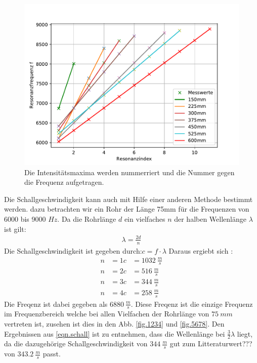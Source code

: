\begin{figure}[h!]
  \centering
  \includegraphics[width=\textwidth]{linearfit.pdf}
  \caption{Die Intensitätsmaxima werden nummerriert und die Nummer gegen die Frequenz aufgetragen.}
  \label{fig.linearfit}
\end{figure}
\FloatBarrier
Die Schallgeschwindigkeit kann auch mit Hilfe einer anderen Methode bestimmt werden.
dazu betrachten wir ein Rohr der Länge 75mm für die Frequenzen von 6000 bis 9000 $\si{Hz}$.
Da die Rohrlänge $d$ ein vielfaches $n$ der halben Wellenlänge $\lambda$ ist gilt:
\begin{align*}
  \lambda = \frac{2d}{n}
\end{align*}
Die Schallgeschwindigkeit ist gegeben durch:$c=f \cdot \lambda$
Daraus ergiebt sich :
\begin{align}
  n&=1  c&=\SI{1032}{\frac{m}{s}}\\
  n&=2  c&=\SI{516}{\frac{m}{s}}\\
  n&=3  c&=\SI{344}{\frac{m}{s}}\\
  \label{eqn.schall}
  n&=4  c&=\SI{258}{\frac{m}{s}}
\end{align}
Die Freqenz ist dabei gegeben als $\SI{6880}{\frac{m}{s}}$.
Diese Freqenz ist die einzige Frequenz im Frequenzbereich welche bei allen Vielfachen der Rohrlänge von $\SI{75}{mm}$ vertreten ist,
zusehen ist dies in den Abb. \ref{fig.1234} und \ref{fig.5678}.
Den Ergebnissen aus \ref{eqn.schall} ist zu entnehmen, dass die Wellenlänge bei $\frac{3}{2}\lambda$ liegt, da die dazugehörige Schallgeschwindigkeit von $\SI{344}{\frac{m}{s}}$ gut zum Litteraturwert??? von $\SI{343.2}{\frac{m}{s}}$ passt.


